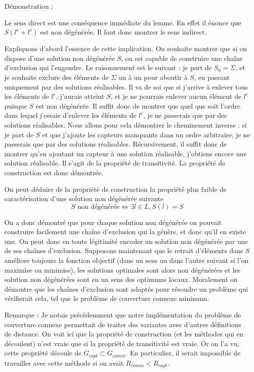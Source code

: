 \documentclass[12pt,a4paper]{article}
\begin{document}
Démonstration :

Le sens direct est une conséquence immédiate du lemme. En effet il énonce que $S(l^e+l^c)$ est non dégénérée. Il faut donc montrer le sens indirect.

Expliquons d'abord l'essence de cette implication. On souhaite montrer que si on dispose d'une solution non dégénérée $S$, on est capable de construire une chaîne d'exclusion qui l'engendre. Le raisonnement est le suivant : je part de $S_0=\Sigma$, et je souhaite exclure des éléments de $\Sigma$ un à un pour aboutir à $S$, en passant uniquement par des solutions réalisables. Il va de soi que si j'arrive à enlever tous les éléments de $l^e$, j'aurais atteint $S$, et je ne pourrais enlever aucun élément de $l^c$ puisque $S$ est non dégénérée. Il suffit donc de montrer que quel que soit l'ordre dans lequel j'essaie d'enlever les éléments de $l^e$, je ne passerais que par des solutions réalisables. Nous allons pour cela démontrer le cheminement inverse :  si je part de $S$ et que j'ajoute les capteurs manquants dans un ordre arbitraire, je ne passerais que par des solutions réalisables. Récursivement, il suffit donc de montrer qu'en ajoutant un capteur à une solution réalisable, j'obtiens encore une solution réalisable. Il s'agit de la propriété de transitivité. La propriété de construction est donc démontrée.

On peut déduire de la propriété de construction la propriété plus faible de caractérisation d'une solution non dégénérée suivante
\[S\text{ non dégénérée} \Leftrightarrow \exists l\in L, S(l)=S\]

On a donc démontré que pour chaque solution non dégénérée on pouvait construire facilement une chaîne d'exclusion qui la génère, et donc qu'il en existe une. On peut donc en toute légitimité encoder un solution non dégénérée par une de ses chaînes d'exclusion. Supposons maintenant que le retrait d'éléments dans $S$ améliore toujours la fonction objectif (dans un sens ou dans l'autre suivant si l'on maximise ou minimise), les solutions optimales sont alors non dégénérées et les solution non dégénérées sont en un sens des optimums locaux. Moralement on démontre que les chaînes d'exclusion sont adaptés pour résoudre un problème qui vérifierait cela, tel que le problème de couverture connexe minimum.  


Remarque : Je notais précédemment que notre implémentation du problème de couverture connexe permettait de traiter des variantes avec d'autres définitions de distance. On voit ici que la propriété de construction (et les méthodes qui en découlent) n'est vraie que si la propriété de transitivité est vraie. Or on l'a vu, cette propriété découle de $G_{capt}\subset G_{comm}$. En particulier, il serait impossible de travailler avec cette méthode si on avait $R_{comm}<R_{capt}$.
\end{document}

